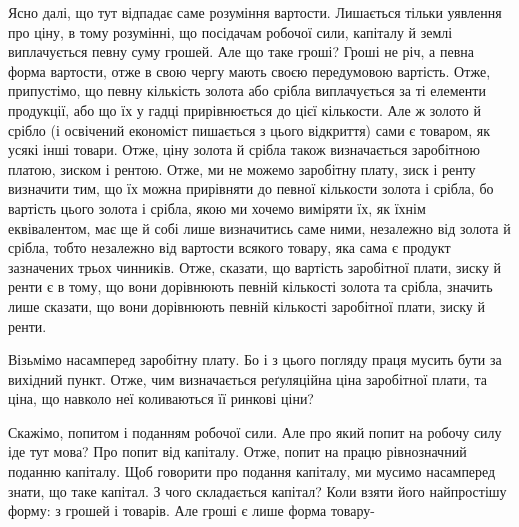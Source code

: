 Ясно далі, що тут відпадає саме розуміння вартости. Лишається тільки
уявлення про ціну, в тому розумінні, що посідачам робочої сили, капіталу
й землі виплачується певну суму грошей. Але що таке гроші? Гроші не річ,
а певна форма вартости, отже в свою чергу мають своєю передумовою вартість.
Отже, припустімо, що певну кількість золота або срібла виплачується за ті елементи
продукції, або що їх у гадці прирівнюється до цієї кількости. Але ж
золото й срібло (і освічений економіст пишається з цього відкриття) сами є
товаром, як усякі інші товари. Отже, ціну золота й срібла також визначається
заробітною платою, зиском і рентою. Отже, ми не можемо заробітну плату, зиск
і ренту визначити тим, що їх можна прирівняти до певної кількости золота
і срібла, бо вартість цього золота і срібла, якою ми хочемо виміряти їх, як їхнім
еквівалентом, має ще й собі лише визначитись саме ними, незалежно від золота
й срібла, тобто незалежно від вартости всякого товару, яка сама є продукт зазначених
трьох чинників. Отже, сказати, що вартість заробітної плати, зиску
й ренти є в тому, що вони дорівнюють певній кількості золота та срібла, значить
лише сказати, що вони дорівнюють певній кількості заробітної плати,
зиску й ренти.

Візьмімо насамперед заробітну плату. Бо і з цього погляду праця мусить
бути за вихідний пункт. Отже, чим визначається реґуляційна ціна заробітної
плати, та ціна, що навколо неї коливаються її ринкові ціни?

Скажімо, попитом і поданням робочої сили. Але про який попит на робочу
силу іде тут мова? Про попит від капіталу. Отже, попит на працю рівнозначний
поданню капіталу. Щоб говорити про подання капіталу, ми мусимо
насамперед знати, що таке капітал. З чого складається капітал? Коли взяти
його найпростішу форму: з грошей і товарів. Але гроші є лише форма товару-
\parbreak{}  %
